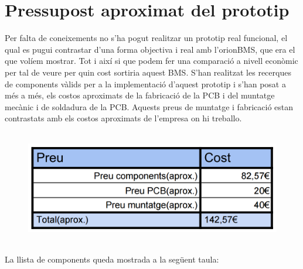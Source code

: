 \chapter{Pressupost aproximat del prototip}
\label{chap:Pressupost del prototip}

Per falta de coneixements no s'ha pogut realitzar un prototip real funcional, el qual es pugui contrastar d'una forma objectiva i real amb \newline l'orionBMS, que era el que volíem mostrar. Tot i així si que podem fer una comparació a nivell econòmic per tal de veure per quin cost sortiria aquest BMS. S'han realitzat les recerques de components vàlids per a la implementació d'aquest prototip i s'han posat a més a més, els costos aproximats de la fabricació de la PCB i del muntatge mecànic i de soldadura de la PCB. Aquests preus de muntatge i fabricació estan contrastats amb els costos aproximats de l'empresa on hi treballo.

\begin{figure}[H]
	\centering
    \includegraphics[width=\textwidth, height=5cm] {Pressupost/costBMS.png}
\end{figure}

La llista de components queda mostrada a la següent taula:

\newpage

